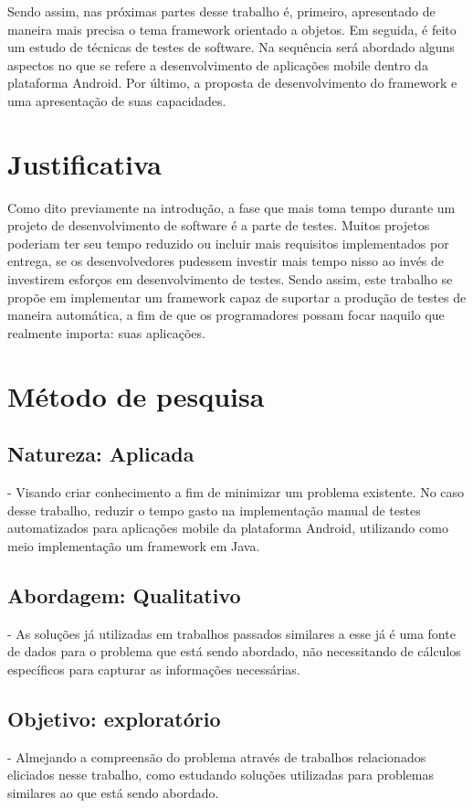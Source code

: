 \documentclass[
    12pt,       %
    openright,      %
    twoside,      %
    a4paper,      %
    english,      %
    french,       %
    spanish,      %
    brazil,       %
    ]{abntex2}
\begin{document}
  Sendo assim, nas próximas partes desse trabalho é, primeiro, apresentado de maneira
  mais precisa o tema framework orientado a objetos. Em seguida, é feito um estudo de
  técnicas de testes de software. Na sequência será abordado alguns aspectos no que se refere a
  desenvolvimento de aplicações mobile dentro da plataforma Android. Por último, a
  proposta de desenvolvimento do framework e uma apresentação de suas capacidades.

  \section{Justificativa}
      Como dito previamente na introdução, a fase que mais toma tempo durante
      um projeto de desenvolvimento de software é a parte de testes. Muitos
      projetos poderiam ter seu tempo reduzido ou incluir mais requisitos
      implementados por entrega, se os desenvolvedores pudessem investir mais
      tempo nisso ao invés de investirem esforços em desenvolvimento de testes.
      Sendo assim, este trabalho se propõe em implementar um framework capaz de
      suportar a produção de testes de maneira automática, a fim de que os
      programadores possam focar naquilo que realmente importa: suas aplicações.

  \section{Método de pesquisa}

    \subsection{Natureza: Aplicada} - Visando criar conhecimento a fim de minimizar
    um problema existente. No caso desse trabalho, reduzir o tempo gasto na
    implementação manual de testes automatizados para aplicações mobile da
    plataforma Android, utilizando como meio implementação um framework
    em Java.

    \subsection{Abordagem: Qualitativo} - As soluções já utilizadas em trabalhos
    passados similares a esse já é uma fonte de dados para o problema que
    está sendo abordado, não necessitando de cálculos específicos para
    capturar as informações necessárias.

    \subsection{Objetivo: exploratório} - Almejando a compreensão do problema através
    de trabalhos relacionados eliciados nesse trabalho, como estudando soluções
    utilizadas para problemas similares ao que está sendo abordado.
\end{document}
